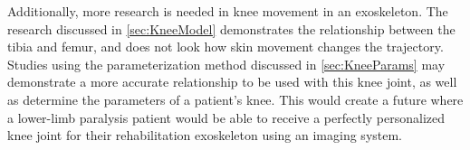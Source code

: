 Additionally, more research is needed in knee movement in an exoskeleton. The research discussed in \autoref{sec:KneeModel} demonstrates the relationship between the tibia and femur, and does not look how skin movement changes the trajectory. Studies using the parameterization method discussed in \autoref{sec:KneeParams} may demonstrate a more accurate relationship to be used with this knee joint, as well as determine the parameters of a patient's knee. This would create a future where a lower-limb paralysis patient would be able to receive a perfectly personalized knee joint for their rehabilitation exoskeleton using an imaging system. 